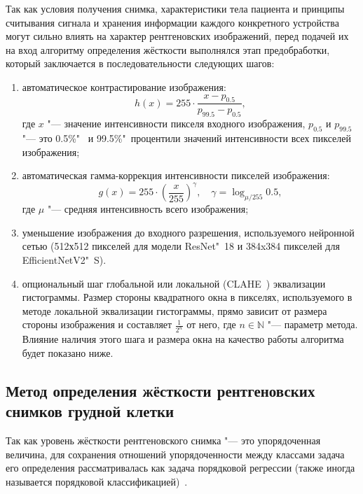 Так как условия получения снимка, характеристики тела пациента и принципы считывания сигнала и хранения информации каждого конкретного устройства могут сильно влиять на характер рентгеновских изображений, перед подачей их на вход алгоритму определения жёсткости выполнялся этап предобработки, который заключается в последовательности следующих шагов:
\begin{enumerate}[beginpenalty=10000]
	\item автоматическое контрастирование изображения:
	\begin{equation}
	h \left( x \right) = 255 \cdot \frac{x - p_{0.5}}{p_{99.5} - p_{0.5}}, \nonumber
	\end{equation}
	где $x$ "--- значение интенсивности пикселя входного изображения, $p_{0.5}$ и $p_{99.5}$ "--- это 0.5\%"~ и 99.5\%"~процентили значений интенсивности всех пикселей изображения;
	\item автоматическая гамма-коррекция интенсивности пикселей изображения:
	\begin{equation}
	g \left( x \right) = 255 \cdot {\left( \frac{x}{255} \right)}^{\gamma}, \quad \gamma = \log_{\mu / 255}{0.5}, \nonumber
	\end{equation}
	где $\mu$ "--- средняя интенсивность всего изображения;
	\item уменьшение изображения до входного разрешения, используемого нейронной сетью (512х512 пикселей для модели ResNet"~18 и 384x384 пикселей для EfficientNetV2"~S).
	\item опциональный шаг глобальной или локальной (CLAHE~\cite{pizer1987adaptive}) эквализации гистограммы. Размер стороны квадратного окна  в пикселях, используемого в методе локальной эквализации гистограммы, прямо зависит от размера стороны изображения и составляет $\frac{1}{2^n}$ от него, где $n\in\mathbb{N}$ "--- параметр метода. Влияние наличия этого шага и размера окна на качество работы алгоритма будет показано ниже.
\end{enumerate}

\subsection{Метод определения жёсткости рентгеновских снимков грудной клетки}

Так как уровень жёсткости рентгеновского снимка "--- это упорядоченная величина, для сохранения отношений упорядоченности между классами задача его определения рассматривалась как задача порядковой регрессии (также иногда называется порядковой классификацией)~\cite{7161338, 353a0d24-9c24-3a11-a330-afc86b9c39c8}.

